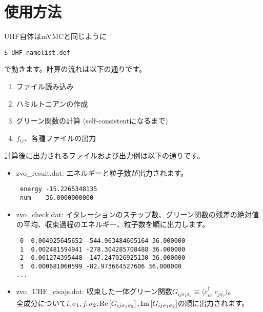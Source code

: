 \section{使用方法}
UHF自体はmVMCと同じように
\begin{verbatim}
$ UHF namelist.def
\end{verbatim}
で動きます。計算の流れは以下の通りです。
\begin{enumerate}
\item{ファイル読み込み}
\item{ハミルトニアンの作成}
\item{グリーン関数の計算 (self-consistentになるまで)}
\item{$f_{ij}$、各種ファイルの出力}
\end{enumerate}
計算後に出力されるファイルおよび出力例は以下の通りです。
\begin{itemize}
\item{zvo\_result.dat:}  エネルギーと粒子数が出力されます。\\
\begin{minipage}{13cm}
\begin{screen}
\begin{verbatim}
 energy -15.2265348135
 num    36.0000000000
\end{verbatim}
\end{screen}
\end{minipage}
\item{zvo\_check.dat:} イタレーションのステップ数、グリーン関数の残差の絶対値の平均、収束過程のエネルギー、粒子数を順に出力します。

\begin{minipage}{13cm}
\begin{screen}
\begin{verbatim}
 0  0.004925645652 -544.963484605164 36.000000
 1  0.002481594941 -278.304285708488 36.000000
 2  0.001274395448 -147.247026925130 36.000000
 3  0.000681060599 -82.973664527606 36.000000
...
\end{verbatim}
\end{screen}
\end{minipage}

\item{zvo\_UHF\_cisajs.dat:} 収束した一体グリーン関数$G_{ij\sigma_1\sigma_2}\equiv\langle c_{i\sigma_1}^{\dag}c_{j\sigma_2}\rangle$。\\
全成分について$i, \sigma_1, j, \sigma_2, {\rm Re}\left[G_{ij\sigma_1\sigma_2}\right], {\rm Im}\left[G_{ij\sigma_1\sigma_2}\right]$の順に出力されます。


\end{itemize}
